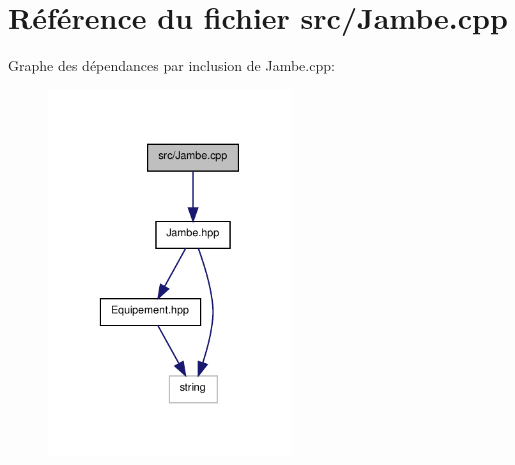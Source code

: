 \section{Référence du fichier src/\-Jambe.cpp}
\label{_jambe_8cpp}
Graphe des dépendances par inclusion de Jambe.\-cpp\-:\nopagebreak
\begin{figure}[H]
\begin{center}
\leavevmode
\includegraphics[width=183pt]{_jambe_8cpp__incl}
\end{center}
\end{figure}
